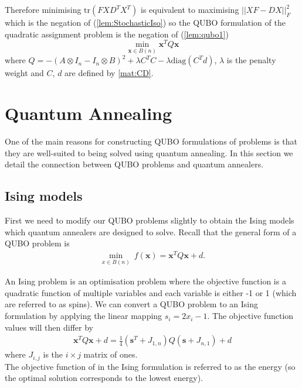 \documentclass{article}
\begin{document}
\noindent Therefore minimising \(\text{tr}(FXD^TX^T)\) is equivalent to maximising \(||XF - DX||_F^2\) which is the negation of (\ref{lem:StochasticIso}) so the QUBO formulation of the quadratic assignment problem is the negation of (\ref{lem:qubo1})
\begin{equation*}
	\min_{\mathbf{x} \in B(n)} \mathbf{x}^T Q \mathbf{x}
\end{equation*}
where \(Q = -(A \otimes I_n - I_n \otimes B)^2 + \lambda C^T C -\lambda\text{diag}(C^T d)\), \(\lambda\) is the penalty weight and \(C\), \(d\) are defined by \ref{mat:CD}.\\

\section{Quantum Annealing}

One of the main reasons for constructing QUBO formulations of problems is that they are well-suited to being solved using quantum annealing. In this section we detail the connection between QUBO problems and quantum annealers. 

\subsection{Ising models}

First we need to modify our QUBO problems slightly to obtain the Ising models which quantum annealers are designed to solve.
Recall that the general form of a QUBO problem is
\begin{align*}
    \min_{x \in B(n)} \: f(\mathbf{x}) = \mathbf{x}^T Q \mathbf{x} + d.
\end{align*}

\noindent An Ising problem is an optimisation problem where the objective function is a quadratic function of multiple variables and each variable is either -1 or 1 (which are referred to as spins). We can convert a QUBO problem to an Ising formulation by applying the linear mapping \(s_i = 2x_i - 1\). The objective function values will then differ by 
\begin{align*}
    \mathbf{x}^T Q \mathbf{x} + d = \frac{1}{4} (\mathbf{s}^T + J_{1,n})Q(\mathbf{s} + J_{n,1}) + d 
\end{align*} 
where \(J_{i,j}\) is the \(i \times j\) matrix of ones.\\

\noindent The objective function of in the Ising formulation is referred to as the energy (so the optimal solution corresponds to the lowest energy). 
\end{document}
